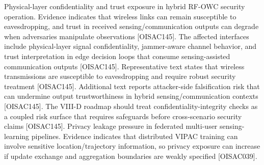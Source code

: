 {}
\markdownRendererSectionEnd \markdownRendererSectionBegin
{}\markdownRendererInterblockSeparator
{}\markdownRendererOlBegin
{} Physical-layer confidentiality and trust exposure in hybrid RF-OWC security operation.\markdownRendererOlItemEnd 
{} Evidence indicates that wireless links can remain susceptible to eavesdropping, and trust in received sensing/communication outputs can degrade when adversaries manipulate observations [O\markdownRendererUnderscore{}ISAC\markdownRendererUnderscore{}145].\markdownRendererOlItemEnd 
{} The affected interfaces include physical-layer signal confidentiality, jammer-aware channel behavior, and trust interpretation in edge decision loops that consume sensing-assisted communication outputs [O\markdownRendererUnderscore{}ISAC\markdownRendererUnderscore{}145].\markdownRendererOlItemEnd 
{} Representative text states that wireless transmissions are susceptible to eavesdropping and require robust security treatment [O\markdownRendererUnderscore{}ISAC\markdownRendererUnderscore{}145]. Additional text reports attacker-side falsification risk that can undermine output trustworthiness in hybrid sensing/communication contexts [O\markdownRendererUnderscore{}ISAC\markdownRendererUnderscore{}145].\markdownRendererOlItemEnd 
{} The VIII-D roadmap should treat confidentiality-integrity checks as a coupled risk surface that requires safeguards before cross-scenario security claims [O\markdownRendererUnderscore{}ISAC\markdownRendererUnderscore{}145].\markdownRendererOlItemEnd 
\markdownRendererOlEnd \markdownRendererInterblockSeparator
{}
\markdownRendererSectionEnd \markdownRendererSectionBegin
{}\markdownRendererInterblockSeparator
{}\markdownRendererOlBegin
{} Privacy leakage pressure in federated multi-user sensing-learning pipelines.\markdownRendererOlItemEnd 
{} Evidence indicates that distributed VIPAC training can involve sensitive location/trajectory information, so privacy exposure can increase if update exchange and aggregation boundaries are weakly specified [O\markdownRendererUnderscore{}ISAC\markdownRendererUnderscore{}039].\markdownRendererOlItemEnd 
